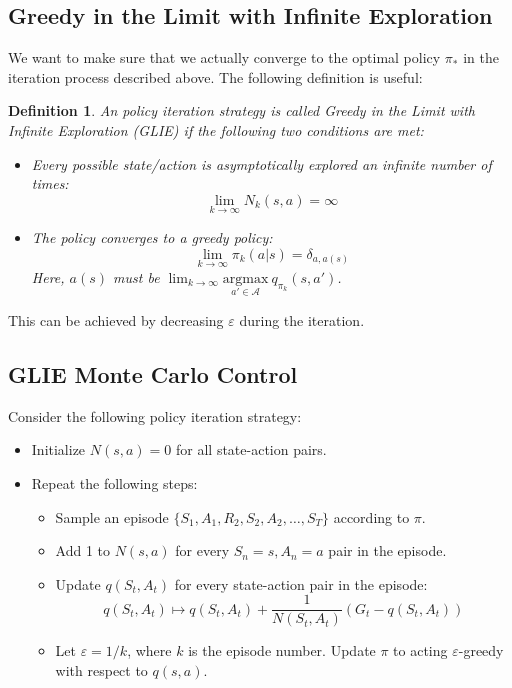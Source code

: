 \documentclass[12pt, a4paper]{article}
\newtheorem{definition}{Definition}[section]
\numberwithin{equation}{section}
\begin{document}
\subsection{Greedy in the Limit with Infinite Exploration}
We want to make sure that we actually converge to the optimal policy $\pi_*$ in the iteration process described above. The following definition is useful:

\begin{definition}
An policy iteration strategy is called Greedy in the Limit with Infinite Exploration (GLIE) if the following two conditions are met:
\begin{itemize}
\item Every possible state/action is asymptotically explored an infinite number of times:
\begin{equation}
\lim_{k\rightarrow\infty}N_k(s,a)=\infty
\end{equation} 
\item The policy converges to a greedy policy:
\begin{equation}
\lim_{k\rightarrow\infty}\pi_k(a|s)=\delta_{a,a(s)}
\end{equation}
Here, $a(s)$ must be $\lim_{k\rightarrow\infty}\underset{a'\in\mathcal{A}}{\textrm{argmax}}\ q_{\pi_k}(s,a')$.
\end{itemize}
\end{definition}

This can be achieved by decreasing $\varepsilon$ during the iteration.

\subsection{GLIE Monte Carlo Control}
Consider the following policy iteration strategy:
\begin{itemize}
\item Initialize $N(s,a)=0$ for all state-action pairs.
\item Repeat the following steps:
\begin{itemize}
\item Sample an episode $\{S_1,A_1,R_2,S_2,A_2,\ldots,S_T\}$ according to $\pi$.
\item Add 1 to $N(s,a)$ for every $S_n=s, A_n=a$ pair in the episode.
\item Update $q(S_t,A_t)$ for every state-action pair in the episode:
\begin{equation}
q(S_t,A_t)\mapsto q(S_t,A_t)+\frac{1}{N(S_t,A_t)}(G_t-q(S_t,A_t))
\end{equation}
\item Let $\varepsilon=1/k$, where $k$ is the episode number. Update $\pi$ to acting $\varepsilon$-greedy with respect to $q(s,a)$.
\end{itemize}
\end{itemize}
\end{document}
